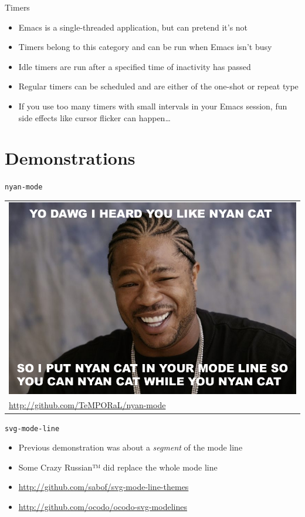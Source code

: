 \documentclass[presentation]{beamer}
\begin{document}
\begin{frame}[label=sec-2-8]{Timers}
\begin{itemize}
\item Emacs is a single-threaded application, but can pretend it's not
\item Timers belong to this category and can be run when Emacs isn't busy
\item Idle timers are run after a specified time of inactivity has passed
\item Regular timers can be scheduled and are either of the one-shot or
repeat type
\item If you use too many timers with small intervals in your Emacs
session, fun side effects like cursor flicker can happen\ldots{}
\end{itemize}
\end{frame}

\section{Demonstrations}
\label{sec-3}

\begin{frame}[fragile,label=sec-3-1]{\texttt{nyan-mode}}
 \begin{center}
\begin{tabu} to 8cm {X[c]}
\includegraphics[width=.9\linewidth]{./images/xzibit-nyancat.png}\\
\url{http://github.com/TeMPORaL/nyan-mode}\\
\end{tabu}
\end{center}
\end{frame}

\begin{frame}[fragile,label=sec-3-2]{\texttt{svg-mode-line}}
 \begin{itemize}
\item Previous demonstration was about a \emph{segment} of the mode line
\item Some Crazy Russian™ did replace the whole mode line
\item \url{http://github.com/sabof/svg-mode-line-themes}
\item \url{http://github.com/ocodo/ocodo-svg-modelines}
\end{itemize}
\end{frame}
\end{document}
